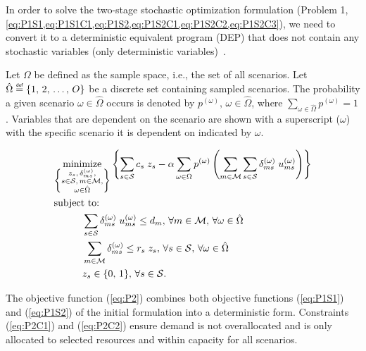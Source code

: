 \documentclass[12pt,dvipsnames]{report}
\newcommand\defeq{\mathrel{\overset{\makebox[0pt]{\mbox{\normalfont\tiny\sffamily def}}}{=}}}
\begin{document}
In order to solve the two-stage stochastic optimization formulation (Problem 1, \cref{eq:P1S1,eq:P1S1C1,eq:P1S2,eq:P1S2C1,eq:P1S2C2,eq:P1S2C3}), we need to convert it to a deterministic equivalent program (DEP) that does not contain any stochastic variables (only deterministic variables)~\cite{stochprogramming}.

Let $\Omega$ be defined as the sample space, i.e., the set of all scenarios.  Let $\hat{\Omega} \defeq \{1,\, 2,\, \ldots,\, O\}$ be a discrete set containing sampled scenarios.  The probability a given scenario $\omega \in \hat{\Omega}$ occurs is denoted by $p^{(\omega)},\, \omega \in \hat{\Omega}$, where $\sum_{\omega \in \hat{\Omega}} p^{(\omega)} = 1$.  Variables that are dependent on the scenario are shown with a superscript ($\omega$) with the specific scenario it is dependent on indicated by $\omega$.

\vspace{3mm}
\begin{tcolorbox}[title = Problem 2 (Deterministic Equivalent Program of Problem 1)]
\begin{align}
& \underset{\left\{ \substack{
	z_s,\, \delta_{ms}^{(\omega)},\\
	s \in \mathcal{S},\, m \in \mathcal{M},\\
	\omega \in \hat{\Omega}} \right\}} {\text{minimize}}
\left\{ \sum_{s \in \mathcal{S}} c_s \; z_s - \alpha \sum_{\omega \in \Omega} p^{(\omega)} \left( \sum_{m \in \mathcal{M}} \sum_{s \in \mathcal{S}} \delta_{ms}^{(\omega)} \; u_{ms}^{(\omega)} \right) \right\} \label{eq:P2}\\
& \text{subject to:}  \nonumber \\
& \hspace{0.4in} \sum_{s \in \mathcal{S}} \delta_{ms}^{(\omega)} \; u_{ms}^{(\omega)} \leq d_m,\, \forall m \in \mathcal{M},\, \forall \omega \in \hat{\Omega} \label{eq:P2C1}\\
& \hspace{0.4in} \sum_{m \in \mathcal{M}} \delta_{ms}^{(\omega)} \leq r_s \; z_s,\, \forall s \in \mathcal{S},\, \forall \omega \in \hat{\Omega} \label{eq:P2C2}\\
& \hspace{0.4in} z_s \in \{0,\, 1\},\, \forall s \in \mathcal{S}. \label{eq:P2C3}
\end{align}
\end{tcolorbox}

The objective function (\ref{eq:P2}) combines both objective functions (\ref{eq:P1S1}) and (\ref{eq:P1S2}) of the initial formulation into a deterministic form.  Constraints (\ref{eq:P2C1}) and (\ref{eq:P2C2})	ensure demand is not overallocated and is only allocated to selected resources and within capacity for all scenarios.
\end{document}
